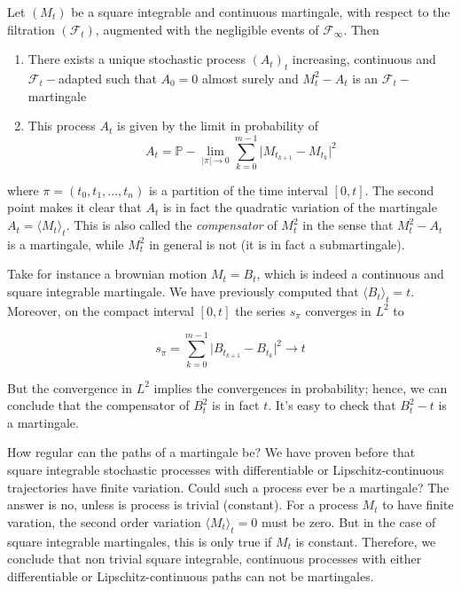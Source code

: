 \begin{theorem}[Doob]
    Let $(M_t)$ be a square integrable and continuous martingale, with respect to the filtration $(\mathcal{F}_t)$, augmented with the negligible events of $\mathcal{F}_{\infty}$. Then 
    \begin{enumerate}
        \item There exists a unique stochastic process $(A_t)_t$ increasing, continuous and $\mathcal{F}_t-$adapted such that $A_0 = 0$ almost surely and $M_t^2 - A_t$ is an $\mathcal{F}_t-$martingale
        \item This process $A_t$ is given by the limit in probability of 
        \begin{equation}
            A_t = \mathbb{P}-\lim_{\vert \pi \vert \to 0} \sum_{k=0}^{m-1} \vert M_{t_{k+1}} - M_{t_k} \vert^2
        \end{equation}
    \end{enumerate}
\end{theorem}

where $\pi = (t_0,t_1,...,t_n)$ is a partition of the time interval $[0,t]$. The second point makes it clear that $A_t$ is in fact the quadratic variation of the martingale $A_t = \langle M_t \rangle_t$. This is also called the \textit{compensator} of $M_t^2$ in the sense that $M_t^2 - A_t$ is a martingale, while $M_t^2$ in general is not (it is in fact a submartingale). 

Take for instance a brownian motion $M_t = B_t$, which is indeed a continuous and square integrable martingale. We have previously computed that $\langle B_t \rangle_t = t$. Moreover, on the compact interval $[0,t]$ the series $s_{\pi}$ converges in $L^2$ to

\begin{equation*}
    s_{\pi} = \sum_{k=0}^{m-1} \vert B_{t_{k+1}}-B_{t_k} \vert^2 \to t 
\end{equation*}

But the convergence in $L^2$ implies the convergences in probability; hence, we can conclude that the compensator of $B_t^2$ is in fact $t$. It's easy to check that $B_t^2-t$ is a martingale. 

How regular can the paths of a martingale be? We have proven before that square integrable stochastic processes with differentiable or Lipschitz-continuous trajectories have finite variation. Could such a process ever be a martingale? The answer is no, unless is process is trivial (constant). For a process $M_t$ to have finite varation, the second order variation $\langle M_t \rangle_t = 0$ must be zero. But in the case of square integrable martingales, this is only true if $M_t$ is constant. Therefore, we conclude that non trivial square integrable, continuous processes with either differentiable or Lipschitz-continuous paths can not be martingales.

